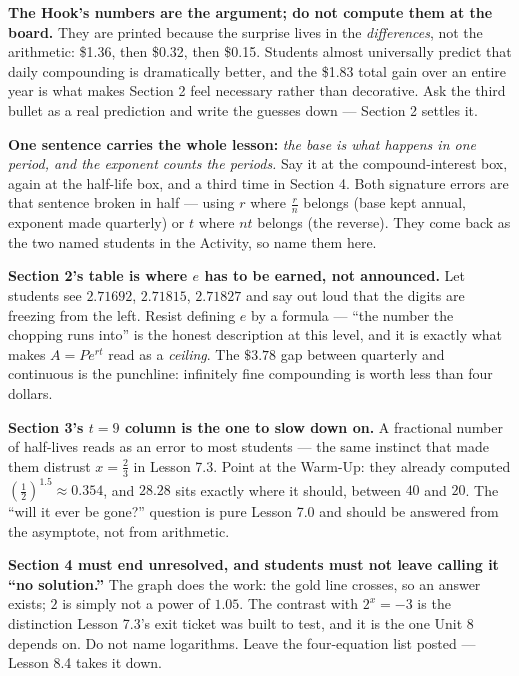 \documentclass[10pt]{article}
\begin{document}
\begin{teachernote}
\textbf{The Hook's numbers are the argument; do not compute them at the board.} They are printed
because the surprise lives in the \emph{differences}, not the arithmetic: \$1.36, then \$0.32, then
\$0.15. Students almost universally predict that daily compounding is dramatically better, and the
\$1.83 total gain over an entire year is what makes Section 2 feel necessary rather than decorative.
Ask the third bullet as a real prediction and write the guesses down --- Section 2 settles it.

\textbf{One sentence carries the whole lesson:} \emph{the base is what happens in one period, and the
exponent counts the periods.} Say it at the compound-interest box, again at the half-life box, and a
third time in Section 4. Both signature errors are that sentence broken in half --- using $r$ where
$\frac{r}{n}$ belongs (base kept annual, exponent made quarterly) or $t$ where $nt$ belongs (the
reverse). They come back as the two named students in the Activity, so name them here.

\textbf{Section 2's table is where $e$ has to be earned, not announced.} Let students see $2.71692$,
$2.71815$, $2.71827$ and say out loud that the digits are freezing from the left. Resist defining $e$
by a formula --- ``the number the chopping runs into'' is the honest description at this level, and it
is exactly what makes $A=Pe^{rt}$ read as a \emph{ceiling}. The $\$3.78$ gap between quarterly and
continuous is the punchline: infinitely fine compounding is worth less than four dollars.

\textbf{Section 3's $t=9$ column is the one to slow down on.} A fractional number of half-lives reads
as an error to most students --- the same instinct that made them distrust $x=\frac23$ in Lesson 7.3.
Point at the Warm-Up: they already computed $\left(\frac12\right)^{1.5}\approx0.354$, and
$28.28$ sits exactly where it should, between $40$ and $20$. The ``will it ever be gone?'' question is
pure Lesson 7.0 and should be answered from the asymptote, not from arithmetic.

\textbf{Section 4 must end unresolved, and students must not leave calling it ``no solution.''} The
graph does the work: the gold line crosses, so an answer exists; $2$ is simply not a power of $1.05$.
The contrast with $2^{x}=-3$ is the distinction Lesson 7.3's exit ticket was built to test, and it is
the one Unit 8 depends on. Do not name logarithms. Leave the four-equation list posted --- Lesson 8.4
takes it down.
\end{teachernote}
\end{document}
